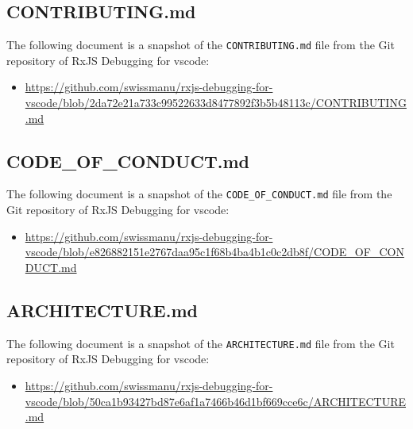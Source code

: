 








\subsection{CONTRIBUTING.md \label{sec:contributing}}
The following document is a snapshot of the \texttt{CONTRIBUTING.md} file from the Git repository of RxJS Debugging for vscode:

\begin{itemize}
  \item \url{https://github.com/swissmanu/rxjs-debugging-for-vscode/blob/2da72e21a733c99522633d8477892f3b5b48113c/CONTRIBUTING.md}
\end{itemize}







\subsection{CODE\_OF\_CONDUCT.md \label{sec:code-of-conduct}}
The following document is a snapshot of the \texttt{CODE\_OF\_CONDUCT.md} file from the Git repository of RxJS Debugging for vscode:

\begin{itemize}
  \item \url{https://github.com/swissmanu/rxjs-debugging-for-vscode/blob/e826882151e2767daa95c1f68b4ba4b1c0c2db8f/CODE_OF_CONDUCT.md}
\end{itemize}










\subsection{ARCHITECTURE.md \label{sec:architecture}}
The following document is a snapshot of the \texttt{ARCHITECTURE.md} file from the Git repository of RxJS Debugging for vscode:

\begin{itemize}
  \item \url{https://github.com/swissmanu/rxjs-debugging-for-vscode/blob/50ca1b93427bd87e6af1a7466b46d1bf669cce6c/ARCHITECTURE.md}
\end{itemize}

